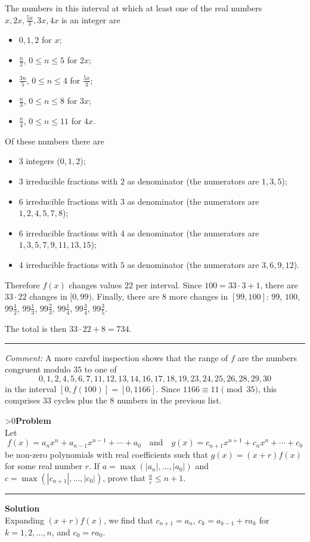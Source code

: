 \documentclass[12pt,oneside,a4paper]{book}
\newcounter{probnum}
\newcounter{solnum}
\newcommand{\prob}{\ifnum\value{probnum}>0\newpage\fi\setcounter{solnum}{0}\stepcounter{probnum}\textbf{Problem \theprobnum}\\}
\newcommand{\comment}{\medskip\hrule\medbreak\emph{Comment: }}
\newcommand{\sol}{\medskip\hrule\medbreak\textbf{Solution}\\}
\begin{document}
The numbers in this interval at which at least one of the real numbers $x,2x,\frac{5x}3,3x,4x$ is an integer are
\begin{itemize}
\item $0,1,2$ for $x$;
\item $\frac n2$, $0\le n\le 5$ for $2x$;
\item $\frac{3n}5$, $0\le n\le 4$ for $\frac{5x}3$;
\item $\frac n3$, $0\le n\le 8$ for $3x$;
\item $\frac n4$, $0\le n\le 11$ for $4x$.
\end{itemize}

Of these numbers there are
\begin{itemize}
\item $3$ integers ($0,1,2$);
\item $3$ irreducible fractions with $2$ as denominator (the numerators are $1,3,5$);
\item $6$ irreducible fractions with $3$ as denominator (the numerators are $1,2,4,5,7,8$);
\item $6$ irreducible fractions with $4$ as denominator (the numerators are $1,3,5,7,9,11,13,15$);
\item $4$ irreducible fractions with $5$ as denominator (the numerators are $3,6,9,12$).
\end{itemize}

Therefore $f(x)$ changes values $22$ per interval. Since $100 = 33\cdot 3 + 1$, there are $33\cdot 22$ changes in $[0,99)$. Finally, there are $8$ more changes in $[99,100]$: $99$, $100$, $99\frac12$, $99\frac13$, $99\frac23$, $99\frac14$, $99\frac34$, $99\frac35$.

The total is then $33\cdot 22+8=734$.

\comment
A more careful inspection shows that the range of $f$ are the numbers congruent modulo $35$ to one of
\[0, 1, 2, 4, 5, 6, 7, 11, 12, 13, 14, 16, 17, 18, 19, 23, 24, 25, 26, 28, 29, 30\]
in the interval $[0,f(100)] = [0,1166]$. Since $1166 \equiv 11\pmod{35}$, this comprises $33$ cycles plus the $8$ numbers in the previous list.

\prob Let
\[f(x) = a_nx^n+a_{n-1}x^{n-1}+\cdots+a_0\quad\text{and}\quad g(x)=c_{n+1}x^{n+1}+c_nx^n+\cdots+c_0\]
be non-zero polynomials with real coefficients such that $g(x)=(x+r)f(x)$ for some real number $r$. If $a=\max(|a_n|,\ldots,|a_0|)$ and $c=\max(|c_{n+1}|,\ldots,|c_0|)$, prove that $\frac ac \le n+1$.

\sol
Expanding $(x+r)f(x)$, we find that $c_{n+1} = a_n$, $c_k=a_{k-1}+ra_k$ for $k=1,2,\ldots,n$, and $c_0=ra_0$.
\end{document}
